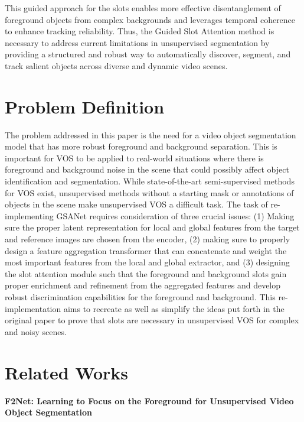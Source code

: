 \documentclass{article}
\theoremstyle{plain}
\theoremstyle{definition}
\theoremstyle{remark}
\begin{document}
\hspace{20pt} This guided approach for the slots enables more effective disentanglement of foreground objects from complex backgrounds and leverages temporal coherence to enhance tracking reliability. Thus, the Guided Slot Attention method is necessary to address current limitations in unsupervised segmentation by providing a structured and robust way to automatically discover, segment, and track salient objects across diverse and dynamic video scenes.

\section*{Problem Definition}
\hspace{20pt} The problem addressed in this paper is the need for a video object segmentation model that has more robust foreground and background separation. This is important for VOS to be applied to real-world situations where there is foreground and background noise in the scene that could possibly affect object identification and segmentation. While state-of-the-art semi-supervised methods for VOS exist, unsupervised methods without a starting mask or annotations of objects in the scene make unsupervised VOS a difficult task. The task of re-implementing GSANet requires consideration of three crucial issues: (1) Making sure the proper latent representation for local and global features from the target and reference images are chosen from the encoder, (2) making sure to properly design a feature aggregation transformer that can concatenate and weight the most important features from the local and global extractor, and (3) designing the slot attention module such that the foreground and background slots gain proper enrichment and refinement from the aggregated features and develop robust discrimination capabilities for the foreground and background. This re-implementation aims to recreate as well as simplify the ideas put forth in the original paper to prove that slots are necessary in unsupervised VOS for complex and noisy scenes.

\section*{Related Works}
\textbf{F2Net: Learning to Focus on the Foreground for Unsupervised Video Object Segmentation}
\end{document}
